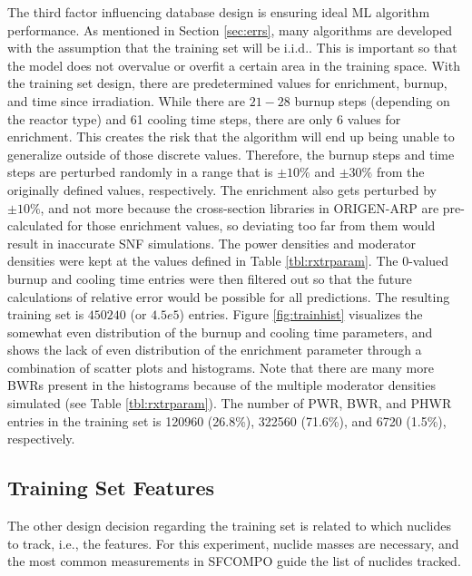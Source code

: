 The third factor influencing database design is ensuring ideal \gls{ML}
algorithm performance.  As mentioned in Section \ref{sec:errs}, many algorithms
are developed with the assumption that the training set will be
\acrfull{i.i.d.}.  This is important so that the model does not overvalue or
overfit a certain area in the training space. With the training set design,
there are predetermined values for enrichment, burnup, and time since
irradiation.  While there are $21-28$ burnup steps 
(depending on the reactor type) and 61 cooling time steps, there are only 6
values for enrichment. This creates the risk that the algorithm will end up
being unable to generalize outside of those discrete values. Therefore, the
burnup steps and time steps are perturbed randomly in a range that is $\pm10\%$
and $\pm30\%$ from the originally defined values, respectively.  The enrichment
also gets perturbed by $\pm10\%$, and not more because the cross-section
libraries in \gls{ORIGEN-ARP} are pre-calculated for those enrichment values,
so deviating too far from them would result in inaccurate \gls{SNF}
simulations. The power densities and moderator densities were kept at the
values defined in Table \ref{tbl:rxtrparam}. The 0-valued burnup and cooling
time entries were then filtered out so that the future calculations of relative
error would be possible for all predictions.  The resulting training set is
$450240$ (or $4.5e5$) entries.  Figure \ref{fig:trainhist} visualizes the
somewhat even distribution of the burnup and cooling time parameters, and shows
the lack of even distribution of the enrichment parameter through a combination
of scatter plots and histograms.  Note that there are many more \gls{BWR}s
present in the histograms because of the multiple moderator densities simulated
(see Table \ref{tbl:rxtrparam}). The number of \gls{PWR}, \gls{BWR}, and
\gls{PHWR} entries in the training set is 120960 (26.8\%), 322560 (71.6\%), and
6720 (1.5\%), respectively.

\subsection{Training Set Features}
\label{sec:snffeats}

The other design decision regarding the training set is related to
which nuclides to track, i.e., the features.  For this experiment, nuclide
masses are necessary, and the most common measurements in \gls{SFCOMPO} guide
the list of nuclides tracked.  

